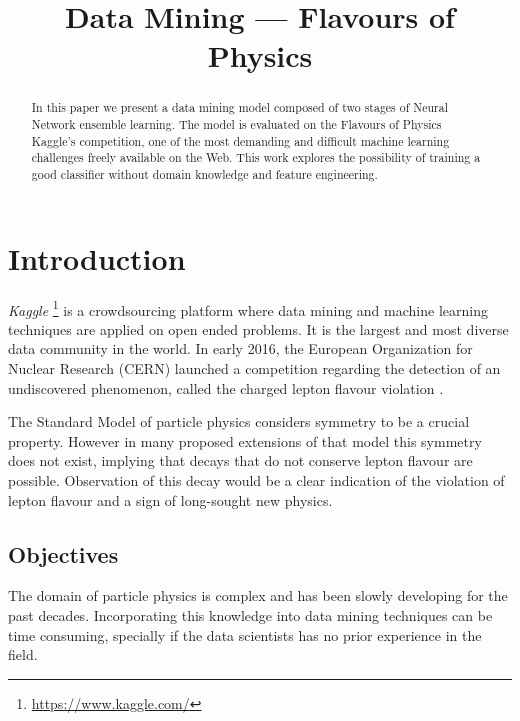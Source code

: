 \documentclass[conference]{IEEEtran}
\begin{document}
\title{Data Mining --- Flavours of Physics}

\author{

}

\maketitle


\begin{abstract}
In this paper we present a data mining model composed of two stages of Neural
Network ensemble learning. The model is evaluated on the Flavours of Physics
Kaggle's competition, one of the most demanding and difficult machine learning
challenges freely available on the Web. This work explores the possibility of
training a good classifier without domain knowledge and feature engineering.
\end{abstract}


\IEEEpeerreviewmaketitle%


\section{Introduction}
\label{sec:intro}
\textit{Kaggle} \footnote{\url{https://www.kaggle.com/}} is a crowdsourcing platform where data mining and machine learning techniques are applied on open ended problems. It is the largest and most diverse data community in the world. In early 2016, the European Organization for Nuclear Research (CERN) launched a competition regarding the detection of an undiscovered phenomenon, called the charged lepton flavour violation \cite{hirsch2011charged}.

The Standard Model of particle physics considers symmetry to be a crucial property. However in many proposed extensions of that model this symmetry does not exist, implying that decays that do not conserve lepton flavour are possible. Observation of this decay would be a clear indication of the violation of lepton flavour and a sign of long-sought new physics.

\subsection{Objectives}
\label{sec:objectives}
The domain of particle physics is complex and has been slowly developing for the past decades. Incorporating this knowledge into data mining techniques can be time consuming, specially if the data scientists has no prior experience in the field.
\end{document}
